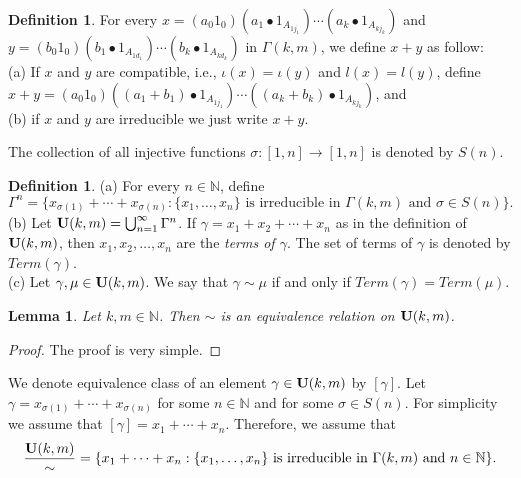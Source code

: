 \documentclass{amsart}
\newtheorem{lemma}[theorem]{Lemma}
\theoremstyle{definition}
\newtheorem{definition}[theorem]{Definition}
\theoremstyle{remark}
\numberwithin{equation}{section}
\newcommand{\U}{{\bf{U}}}
\begin{document}
\begin{definition}
	For every \( x = (a_0 1_0)(a_1\bullet 1_{A_{1j_1}})\cdots(a_k\bullet 1_{A_{kj_k}}) \) and \( y = (b_0 1_0)(b_1\bullet 1_{A_{1d_1}})\cdots(b_k\bullet 1_{A_{kd_k}}) \) in $\Gamma(k,m)$, we define $x+y$ as follow:\\
	(a) If $x$ and $y$ are compatible, i.e., $\iota(x)=\iota(y)$ and $l(x)=l(y)$, define $x+y=(a_0 1_0)((a_1+b_1)\bullet 1_{A_{1j_1}})\cdots((a_k+b_k)\bullet 1_{A_{kj_k}})$, and  \\
	(b) if $x$ and $y$ are irreducible we just write $x+y$. 
\end{definition}
The collection of all injective functions $\sigma:[1,n]\to [1,n]$ is denoted by $S(n)$. 
\begin{definition}
	(a) For every $n\in\mathbb{N}$, define 
	\[
	\Gamma^n=\{x_{\sigma(1)}+\cdots+x_{\sigma(n)}:\{x_1,\ldots,x_n\}\mbox{ is irreducible in }\Gamma(k,m)\mbox{ and }\sigma\in S(n)\}.
	\]
	(b) Let $\U(k,m)=\bigcup_{n=1}^\infty\Gamma^n$. If \( \gamma = x_1 + x_2 + \cdots + x_n \) as in the definition of \( \U(k,m) \), then \( x_1, x_2, \ldots, x_n \) are the \textit{terms of \( \gamma \)}. The set of terms of $\gamma$ is denoted by $Term(\gamma)$.\\
	(c) Let $\gamma,\mu\in\U(k,m)$. We say that $\gamma\sim\mu$ if and only if $Term(\gamma)=Term(\mu)$.
\end{definition}
\begin{lemma}
	Let $k,m\in\mathbb{N}$. Then $\sim$ is an equivalence relation on $\U(k,m)$.
\end{lemma}
\begin{proof}
	The proof is very simple.
\end{proof}
We denote equivalence class of an element $\gamma\in\U(k,m)$ by $[\gamma]$. Let $\gamma=x_{\sigma(1)}+\cdots+x_{\sigma(n)}$ for some $n\in\mathbb{N}$ and for some $\sigma\in S(n)$. For simplicity we assume that $[\gamma]=x_{1}+\cdots+x_{n}$. Therefore, we assume that 
\[
\frac{\U(k,m)}{\sim}=\{x_1+\cdots+x_n:\{x_1,\ldots,x_n\}\mbox{ is irreducible in }\Gamma(k,m)\mbox{ and }n\in\mathbb{N}\}.
\]
\end{document}
